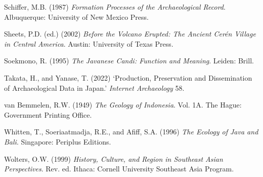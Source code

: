 \documentclass[12pt,a4paper]{article}
\begin{document}
\vspace{0.5em}
\noindent Schiffer, M.B. (1987) \emph{Formation Processes of the Archaeological Record}. Albuquerque: University of New Mexico Press.

\vspace{0.5em}
\noindent Sheets, P.D. (ed.) (2002) \emph{Before the Volcano Erupted: The Ancient Cer\'{e}n Village in Central America}. Austin: University of Texas Press.

\vspace{0.5em}
\noindent Soekmono, R. (1995) \emph{The Javanese Candi: Function and Meaning}. Leiden: Brill.

\vspace{0.5em}
\noindent Takata, H., and Yanase, T. (2022) `Production, Preservation and Dissemination of Archaeological Data in Japan.' \emph{Internet Archaeology} 58.

\vspace{0.5em}
\noindent van Bemmelen, R.W. (1949) \emph{The Geology of Indonesia}. Vol. 1A. The Hague: Government Printing Office.

\vspace{0.5em}
\noindent Whitten, T., Soeriaatmadja, R.E., and Afiff, S.A. (1996) \emph{The Ecology of Java and Bali}. Singapore: Periplus Editions.

\vspace{0.5em}
\noindent Wolters, O.W. (1999) \emph{History, Culture, and Region in Southeast Asian Perspectives}. Rev. ed. Ithaca: Cornell University Southeast Asia Program.
\end{document}
